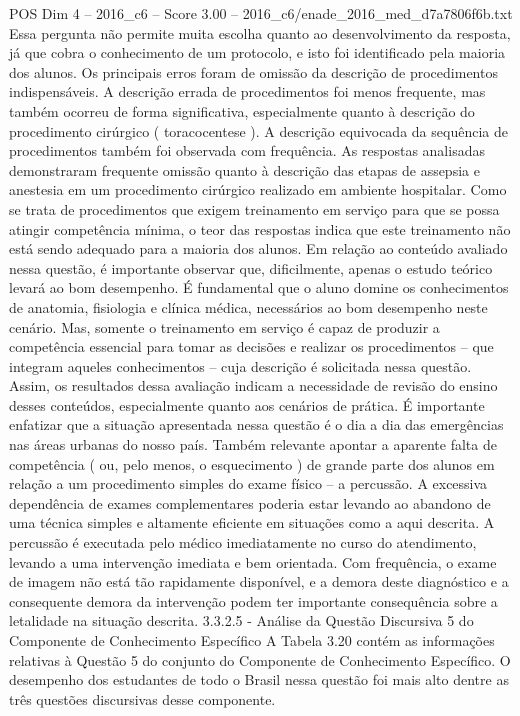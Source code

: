 \begin{textsample}{POS Dim 4 – 2016\_c6 – Score 3.00 – 2016\_c6/enade\_2016\_med\_d7a7806f6b.txt}
Essa pergunta não permite muita escolha quanto ao desenvolvimento da resposta, já que cobra o conhecimento de um protocolo, e isto foi identificado pela maioria dos alunos.
Os principais erros foram de omissão da descrição de procedimentos indispensáveis.
A descrição errada de procedimentos foi menos frequente, mas também ocorreu de forma significativa, especialmente quanto à descrição do procedimento cirúrgico ( toracocentese ).
A descrição equivocada da sequência de procedimentos também foi observada com frequência.
As respostas analisadas demonstraram frequente omissão quanto à descrição das etapas de assepsia e anestesia em um procedimento cirúrgico realizado em ambiente hospitalar.
Como se trata de procedimentos que exigem treinamento em serviço para que se possa atingir competência mínima, o teor das respostas indica que este treinamento não está sendo adequado para a maioria dos alunos.
Em relação ao conteúdo avaliado nessa questão, é importante observar que, dificilmente, apenas o estudo teórico levará ao bom desempenho.
É fundamental que o aluno domine os conhecimentos de anatomia, fisiologia e clínica médica, necessários ao bom desempenho neste cenário.
Mas, somente o treinamento em serviço é capaz de produzir a competência essencial para tomar as decisões e realizar os procedimentos – que integram aqueles conhecimentos – cuja descrição é solicitada nessa questão.
Assim, os resultados dessa avaliação indicam a necessidade de revisão do ensino desses conteúdos, especialmente quanto aos cenários de prática.
É importante enfatizar que a situação apresentada nessa questão é o dia a dia das emergências nas áreas urbanas do nosso país.
Também relevante apontar a aparente falta de competência ( ou, pelo menos, o esquecimento ) de grande parte dos alunos em relação a um procedimento simples do exame físico – a percussão.
A excessiva dependência de exames complementares poderia estar levando ao abandono de uma técnica simples e altamente eficiente em situações como a aqui descrita.
A percussão é executada pelo médico imediatamente no curso do atendimento, levando a uma intervenção imediata e bem orientada.
Com frequência, o exame de imagem não está tão rapidamente disponível, e a demora deste diagnóstico e a consequente demora da intervenção podem ter importante consequência sobre a letalidade na situação descrita. 3.3.2.5 - Análise da Questão Discursiva 5 do Componente de Conhecimento Específico A Tabela 3.20 contém as informações relativas à Questão 5 do conjunto do Componente de Conhecimento Específico.
O desempenho dos estudantes de todo o Brasil nessa questão foi mais alto dentre as três questões discursivas desse componente.

\end{textsample}
